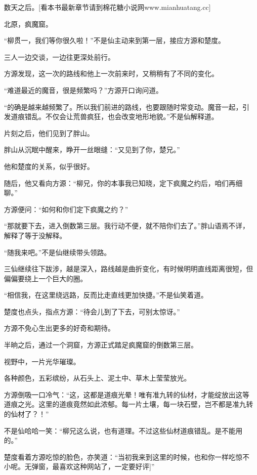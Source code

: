 
\begin{this_body}

数天之后。[看本书最新章节请到棉花糖小说网www.mianhuatang.cc]

北原，疯魔窟。

“柳贯一，我们等你很久啦！”不是仙主动来到第一层，接应方源和楚度。

三人一边交谈，一边往更深处前行。

方源发现，这一次的路线和他上一次前来时，又稍稍有了不同的变化。

“难道最近的魔音，很是频繁吗？”方源开口询问道。

“的确是越来越频繁了。所以我们前进的路线，也要跟随时常变动。魔音一起，引发道痕错乱。不仅会让荒兽疯狂，也会改变地形地貌。”不是仙解释道。

片刻之后，他们见到了胖山。

胖山从沉眠中醒来，睁开一丝眼缝：“又见到了你，楚兄。”

他和楚度的关系，似乎很好。

随后，他又看向方源：“柳兄，你的本事我已知晓，定下疯魔之约后，咱们再细聊。”

方源便问：“如何和你们定下疯魔之约？”

“那就要下去，进入倒数第三层。我行动不便，就不陪你们去了。”胖山语焉不详，解释了等于没解释。

“随我来吧。”不是仙继续带头领路。

三仙继续往下跋涉，越是深入，路线越是曲折变化，有时候明明直线距离很短，但偏偏要绕上一个巨大的圈。

“相信我，在这里绕远路，反而比走直线更加快捷。”不是仙笑着道。

楚度也点头，指点方源：“待会儿到了下去，可别太惊讶。”

方源不免心生出更多的好奇和期待。

半晌之后，通过一个洞窟，方源正式踏足疯魔窟的倒数第三层。

视野中，一片光华璀璨。

各种颜色，五彩缤纷，从石头上、泥土中、草木上莹莹放光。

方源倒吸一口冷气：“这，这都是道痕光晕！唯有准九转的仙材，才能绽放出这等道痕之光。这里的道痕竟然如此浓郁。每一片土壤，每一块石壁，岂不都是准九转的仙材了？！”

不是仙哈哈一笑：“柳兄这么说，也有道理。不过这些仙材道痕错乱。是不能用的。”

楚度看着方源吃惊的脸色，亦笑道：“当初我来到这里的时候，也和你一样吃惊不小呢。无弹窗，最喜欢这种网站了，一定要好评]”


\end{this_body}
